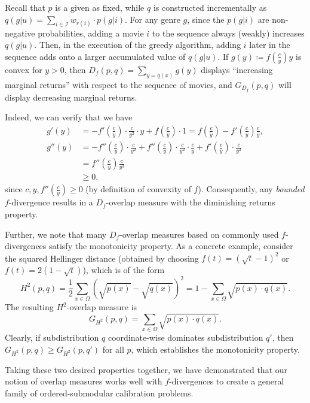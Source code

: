 Recall that $p$ is a given as fixed, while $q$ is constructed incrementally as $q(g|u) = \sum_{i\in \mathcal{I}} w_{r(i)} \cdot p(g|i)$. For any genre $g$, since the $p(g|i)$ are non-negative probabilities, adding a movie $i$ to the sequence always (weakly) increases $q(g|u)$. Then, in the execution of the greedy algorithm, adding $i$ later in the sequence adds onto a larger accumulated value of $q(g|u)$. If $g(y) \coloneqq f\left(\frac{c}{y}\right) y$ is convex for $y > 0$, then $D_f(p,q) = \sum_{y = q(x)} g(y)$ displays ``increasing marginal returns'' with respect to the sequence of movies, and $G_{D_f}(p,q)$ will display decreasing marginal returns.

Indeed, we can verify that we have 
\begin{align*}
    g'(y) &= -f'\left(\frac{c}{y}\right) \cdot \frac{c}{y^2} \cdot y + f\left(\frac{c}{y}\right) \cdot 1 = f\left(\frac{c}{y}\right) - f'\left(\frac{c}{y}\right) \frac{c}{y}, \\
    g''(y) &= -f''\left(\frac{c}{y}\right) \cdot \frac{c}{y^2} + f''\left(\frac{c}{y}\right) \cdot \frac{c}{y^2} \cdot \frac{c}{y} + f'\left(\frac{c}{y}\right) \cdot \frac{c}{y^2} \\
    &= f''\left(\frac{c}{y}\right) \frac{c}{y^3} \\
    &\ge 0,
\end{align*}
since $c,y, f''\left(\frac{c}{y}\right)  \ge 0$ (by definition of convexity of $f$). Consequently, any \emph{bounded} $f$-divergence results in a $D_f$-overlap measure with the diminishing returns property.

Further, we note that many $D_f$-overlap measures based on commonly used $f$-divergences satisfy the monotonicity property. As a concrete example, consider the squared Hellinger distance (obtained by choosing $f(t) = (\sqrt{t}-1)^2$ or $f(t) = 2(1-\sqrt{t})$), which is of the form $$H^2(p,q) = \frac{1}{2} \sum_{x\in \Omega} (\sqrt{p(x)} - \sqrt{q(x)})^2 = 1 - \sum_{x\in \Omega} \sqrt{p(x) \cdot q(x)}.$$ The resulting $H^2$-overlap measure is $$G_{H^2} (p,q) = \sum_{x\in \Omega} \sqrt{p(x) \cdot q(x)}.$$ Clearly, if subdistribution $q$ coordinate-wise dominates subdistribution $q'$, then $G_{H^2}(p,q) \ge G_{H^2}(p,q')$ for all $p$, which establishes the monotonicity property.

Taking these two desired properties together, we have demonstrated that our notion of overlap measures works well with $f$-divergences to create a general family of ordered-submodular calibration problems.

